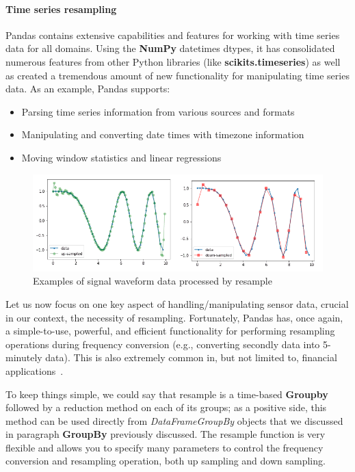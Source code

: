 \paragraph{Time series resampling}
Pandas contains extensive capabilities and features for working with time series data for all domains. Using the \textbf{NumPy} datetimes dtypes, 
it has consolidated numerous features from other Python libraries (like \textbf{scikits.timeseries}) as well as created a tremendous amount of new functionality for manipulating time series data.
As an example, Pandas supports:
\begin{itemize}
    \item Parsing time series information from various sources and formats
    \item Manipulating and converting date times with timezone information
    \item Moving window statistics and linear regressions
\end{itemize}
\begin{figure}[ht]
    \centering
    \includegraphics[width=\textwidth]{content/chapter_3/images/up-down-sample.png}
    \caption{Examples of signal waveform data processed by resample}\label{fig:up and down sampling}
\end{figure}
Let us now focus on one key aspect of handling/manipulating sensor data, crucial in our context, the necessity of resampling.
Fortunately, Pandas has, once again, a simple-to-use, powerful, and efficient functionality for performing resampling operations during frequency conversion
(e.g., converting secondly data into 5-minutely data). This is also extremely common in, but not limited to, financial applications~\cite{Misc:pandas_docs}.

To keep things simple, we could say that resample is a time-based \textbf{Groupby} followed by a reduction method on each of its groups; as a positive side,
this method can be used directly from \textit{DataFrameGroupBy} objects that we discussed in paragraph \textbf{GroupBy} previously discussed.
The resample function is very flexible and allows you to specify many parameters to control the frequency conversion and resampling operation, both up sampling and down sampling.

